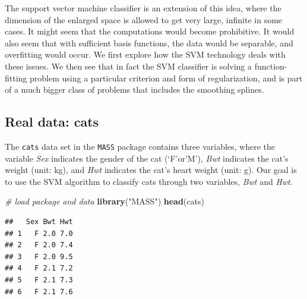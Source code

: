 \documentclass[
]{article}
\newenvironment{Shaded}{\begin{snugshade}}{\end{snugshade}}
\newcommand{\CommentTok}[1]{\textcolor[rgb]{0.56,0.35,0.01}{\textit{#1}}}
\newcommand{\DataTypeTok}[1]{\textcolor[rgb]{0.13,0.29,0.53}{#1}}
\newcommand{\DecValTok}[1]{\textcolor[rgb]{0.00,0.00,0.81}{#1}}
\newcommand{\FloatTok}[1]{\textcolor[rgb]{0.00,0.00,0.81}{#1}}
\newcommand{\KeywordTok}[1]{\textcolor[rgb]{0.13,0.29,0.53}{\textbf{#1}}}
\newcommand{\NormalTok}[1]{#1}
\newcommand{\OperatorTok}[1]{\textcolor[rgb]{0.81,0.36,0.00}{\textbf{#1}}}
\newcommand{\OtherTok}[1]{\textcolor[rgb]{0.56,0.35,0.01}{#1}}
\newcommand{\StringTok}[1]{\textcolor[rgb]{0.31,0.60,0.02}{#1}}
\begin{document}
The support vector machine classifier is an extension of this idea,
where the dimension of the enlarged space is allowed to get very large,
infinite in some cases. It might seem that the computations would become
prohibitive. It would also seem that with sufficient basis functions,
the data would be separable, and overfitting would occur. We first
explore how the SVM technology deals with these issues. We then see that
in fact the SVM classifier is solving a function-fitting problem using a
particular criterion and form of regularization, and is part of a much
bigger class of problems that includes the smoothing splines.

\hypertarget{real-data-cats}{%
\subsection{Real data: cats}\label{real-data-cats}}

The \texttt{cats} data set in the \texttt{MASS} package contains three
variables, where the variable \emph{Sex} indicates the gender of the cat
(`F'or'M'), \emph{Bwt} indicates the cat's weight (unit: kg), and
\emph{Hwt} indicates the cat's heart weight (unit: g). Our goal is to
use the SVM algorithm to classify cats through two variables, \emph{Bwt}
and \emph{Hwt}.

\begin{Shaded}
\begin{Highlighting}[]
\CommentTok{# load package and data}
\KeywordTok{library}\NormalTok{(}\StringTok{"MASS"}\NormalTok{)}
\KeywordTok{head}\NormalTok{(cats)}
\end{Highlighting}
\end{Shaded}

\begin{verbatim}
##   Sex Bwt Hwt
## 1   F 2.0 7.0
## 2   F 2.0 7.4
## 3   F 2.0 9.5
## 4   F 2.1 7.2
## 5   F 2.1 7.3
## 6   F 2.1 7.6
\end{verbatim}

\begin{Shaded}
\end{Shaded}
\end{document}
